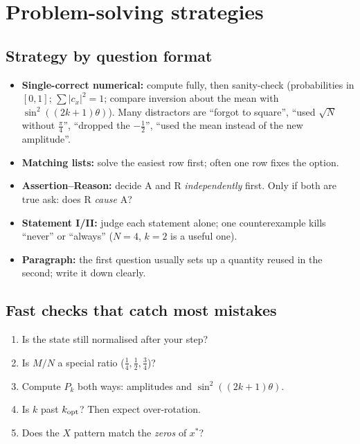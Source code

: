 \documentclass[11pt,a4paper,openany]{book}
\newcommand{\kopt}{k_{\rm opt}}
\newcommand{\xs}{x^\ast}
\begin{document}
\section{Problem-solving strategies}
\subsection{Strategy by question format}
\begin{itemize}[itemsep=3pt]
\item \textbf{Single-correct numerical:} compute fully, then sanity-check (probabilities in $[0,1]$; $\sum|c_x|^2 = 1$; compare inversion about the mean with $\sin^2((2k+1)\theta)$). Many distractors are ``forgot to square'', ``used $\sqrt N$ without $\frac\pi4$'', ``dropped the $-\frac12$'', ``used the mean instead of the new amplitude''.
\item \textbf{Matching lists:} solve the easiest row first; often one row fixes the option.
\item \textbf{Assertion--Reason:} decide A and R \emph{independently} first. Only if both are true ask: does R \emph{cause} A?
\item \textbf{Statement I/II:} judge each statement alone; one counterexample kills ``never'' or ``always'' ($N = 4$, $k = 2$ is a useful one).
\item \textbf{Paragraph:} the first question usually sets up a quantity reused in the second; write it down clearly.
\end{itemize}

\subsection{Fast checks that catch most mistakes}
\begin{enumerate}[itemsep=2pt]
\item Is the state still normalised after your step?
\item Is $M/N$ a special ratio ($\frac14, \frac12, \frac34$)?
\item Compute $P_k$ both ways: amplitudes and $\sin^2((2k+1)\theta)$.
\item Is $k$ past $\kopt$? Then expect over-rotation.
\item Does the $X$ pattern match the \emph{zeros} of $\xs$?
\end{enumerate}
\end{document}
